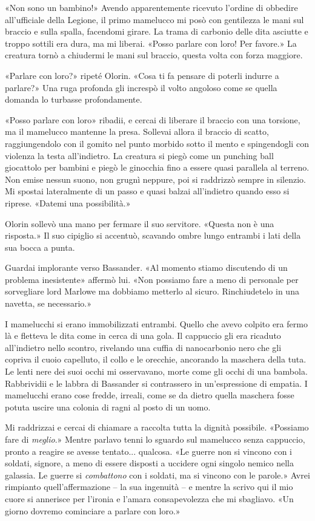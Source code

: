 «Non sono un bambino!» Avendo apparentemente ricevuto l'ordine di
obbedire all'ufficiale della Legione, il primo mamelucco mi posò con
gentilezza le mani sul braccio e sulla spalla, facendomi girare. La
trama di carbonio delle dita asciutte e troppo sottili era dura, ma mi
liberai. «Posso parlare con loro! Per favore.» La creatura tornò a
chiudermi le mani sul braccio, questa volta con forza maggiore.

«Parlare con loro?» ripeté Olorin. «Cosa ti fa pensare di poterli
indurre a parlare?» Una ruga profonda gli increspò il volto angoloso
come se quella domanda lo turbasse profondamente.

«Posso parlare con loro» ribadii, e cercai di liberare il braccio con
una torsione, ma il mamelucco mantenne la presa. Sollevai allora il
braccio di scatto, raggiungendolo con il gomito nel punto morbido sotto
il mento e spingendogli con violenza la testa all'indietro. La creatura
si piegò come un punching ball giocattolo per bambini e piegò le
ginocchia fino a essere quasi parallela al terreno. Non emise nessun
suono, non grugnì neppure, poi si raddrizzò sempre in silenzio. Mi
spostai lateralmente di un passo e quasi balzai all'indietro quando esso
si riprese. «Datemi una possibilità.»

Olorin sollevò una mano per fermare il suo servitore. «Questa non è una
risposta.» Il suo cipiglio si accentuò, scavando ombre lungo entrambi i
lati della sua bocca a punta.

Guardai implorante verso Bassander. «Al momento stiamo discutendo di un
problema inesistente» affermò lui. «Non possiamo fare a meno di
personale per sorvegliare lord Marlowe ma dobbiamo metterlo al sicuro.
Rinchiudetelo in una navetta, se necessario.»

I mamelucchi si erano immobilizzati entrambi. Quello che avevo colpito
era fermo là e fletteva le dita come in cerca di una gola. Il cappuccio
gli era ricaduto all'indietro nello scontro, rivelando una cuffia di
nanocarbonio nero che gli copriva il cuoio capelluto, il collo e le
orecchie, ancorando la maschera della tuta. Le lenti nere dei suoi occhi
mi osservavano, morte come gli occhi di una bambola. Rabbrividii e le
labbra di Bassander si contrassero in un'espressione di empatia. I
mamelucchi erano cose fredde, irreali, come se da dietro quella maschera
fosse potuta uscire una colonia di ragni al posto di un uomo.

Mi raddrizzai e cercai di chiamare a raccolta tutta la dignità
possibile. «Possiamo fare di \emph{meglio}.» Mentre parlavo tenni lo
sguardo sul mamelucco senza cappuccio, pronto a reagire se avesse
tentato... qualcosa. «Le guerre non si vincono con i soldati, signore, a
meno di essere disposti a uccidere ogni singolo nemico nella galassia.
Le guerre si \emph{combattono} con i soldati, ma si vincono con le
parole.» Avrei rimpianto quell'affermazione -- la sua ingenuità -- e
mentre la scrivo qui il mio cuore si annerisce per l'ironia e l'amara
consapevolezza che mi sbagliavo. «Un giorno dovremo cominciare a parlare
con loro.»

